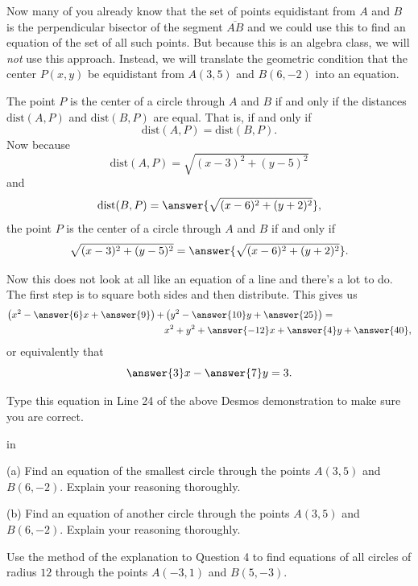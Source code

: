 \documentclass{ximera}
\newcommand{\pskip}{\vskip 0.1 in}
\begin{document}
\begin{example}
\begin{explanation}
Now many of you already know that the set of points equidistant from $A$ and $B$ is the perpendicular bisector of the segment $\overline{AB}$ and we could use this to find an equation of the set of all such points. But because this is an algebra class, we will \emph{not} use this approach. Instead, we will translate the geometric condition that the center $P(x,y)$ be equidistant from $A(3,5)$ and $B(6,-2)$ into an equation.


\begin{question}   \label{Q0dfdf9e9ee}
The point $P$ is the center of a circle through $A$ and $B$ if and only if the distances $\text{dist}(A,P)$ and $\text{dist}(B,P)$ are equal. That is, if and only if
\[
   \text{dist}(A,P)  = \text{dist}(B,P) .
\]
Now because
\[
   \text{dist}(A,P) = \sqrt{(x-3)^2 + (y-5)^2}
\] 
and
\[
  \text{dist}(B,P) = \answer{\sqrt{(x-6)^2 + (y+2)^2}} ,
\]
the point $P$ is the center of a circle through $A$ and $B$ if and only if
\[
   \sqrt{(x-3)^2 + (y-5)^2} = \answer{\sqrt{(x-6)^2 + (y+2)^2}} .
\]

Now this does not look at all like an equation of a line and there's a lot to do. The first step is to square both sides and then distribute. This gives us
\begin{align*}
      \left( x^2 - \answer{6}x +\answer{9}  \right) + & \left( y^2 - \answer{10}y +\answer{25} \right)  = \\
                                                                          & x^2 + y^2 +\answer{-12}x + \answer{4}y + \answer{40} ,
\end{align*} 
or equivalently that
\[
    \answer{3}x - \answer{7}y = 3 .
\]
 
Type this equation in Line 24 of the above Desmos demonstration to make sure you are correct.

\end{question}

\end{explanation}

\pskip

\begin{question} \label{Q1444sfdsf4433}
(a) Find an equation of the smallest circle through the points $A(3,5)$ and $B(6,-2)$. Explain your reasoning thoroughly.

(b) Find an equation of another circle through the points $A(3,5)$ and $B(6,-2)$. Explain your reasoning thoroughly.

\end{question}

\begin{question} \label{Qfr3r34f}
Use the method of the explanation to Question 4 to find equations of all circles of radius $12$ through the points $A(-3,1)$ and $B(5,-3)$.
\end{question}
\end{example}
\end{document}
